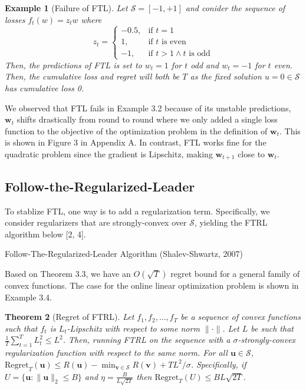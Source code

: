 \documentclass{article}
\newtheorem{theorem}{Theorem}[section]
\newtheorem{example}[theorem]{Example}
\begin{document}
\begin{example}[Failure of FTL]
  Let $\mathcal{S}=[-1,+1]$ and conider the sequence of losses $f_t(w)=z_t w$ where \[z_t=\begin{cases}-0.5, &\text{if }t=1\\1, &\text{if }t\text{ is even}\\-1, &\text{if }t>1 \wedge t\text{ is odd}\end{cases}\] Then, the predictions of FTL is set to $w_t=1$ for $t$ odd and $w_t=-1$ for $t$ even. Then, the cumulative loss and regret will both be $T$ as the fixed solution $u=0\in \mathcal{S}$ has cumulative loss 0.
\end{example}

We observed that FTL fails in Example 3.2 because of its unstable predictions, $\textbf{w}_t$ shifts drastically from round to round where we only added a single loss function to the objective of the optimization problem in the definition of $\textbf{w}_t$. This is shown in Figure 3 in Appendix A. In contrast, FTL works fine for the quadratic problem since the gradient is Lipschitz, making $\textbf{w}_{t+1}$ close to $\textbf{w}_t$.

\subsection{Follow-the-Regularized-Leader}

To stablize FTL, one way is to add a regularization term. Specifically, we consider regularizers that are strongly-convex over $\mathcal{S}$, yielding the FTRL algorithm below [2, 4].

\begin{algorithm}[H]
  \caption{Follow-The-Regularized-Leader Algorithm (Shalev-Shwartz, 2007)}
\end{algorithm}

Based on Theorem 3.3, we have an $O(\sqrt{T})$ regret bound for a general family of convex functions. The case for the online linear optimization problem is shown in Example 3.4.

\begin{theorem}[Regret of FTRL]
  Let $f_1, f_2, \ldots, f_T$ be a sequence of convex functions such that $f_t$ is $L_t$-Lipschitz with respect to some norm $\lVert \cdot \rVert$.
  Let $L$ be such that $\frac{1}{T}\sum_{t=1}^T L_t^2\leq L^2$.
  Then, running FTRL on the sequence with a $\sigma$-strongly-convex regularization function with respect to the same norm.
  For all $\textbf{u}\in \mathcal{S}$, $\text{Regret}_T(\textbf{u})\leq R(\textbf{u})-\min_{\textbf{v}\in \mathcal{S}} R(\textbf{v})+TL^2/\sigma$.
  Specifically, if $U=\{\textbf{u}:\lVert \textbf{u}\rVert_2\leq B\}$ and $\eta=\frac{B}{L\sqrt{2T}}$ then $\text{Regret}_T(U)\leq BL\sqrt{2T}$.
\end{theorem}
\end{document}

